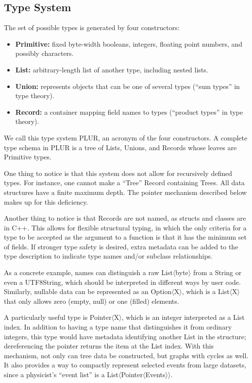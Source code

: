 \documentclass[10pt, conference, compsocconf]{IEEEtran}
\begin{document}
\subsection{Type System}
\label{type-system}

The set of possible types is generated by four constructors:
\begin{itemize}
\item {\bf Primitive:} fixed byte-width booleans, integers, floating point numbers, and possibly characters.
\item {\bf List:} arbitrary-length list of another type, including nested lists.
\item {\bf Union:} represents objects that can be one of several types (``sum types'' in type theory).
\item {\bf Record:} a container mapping field names to types (``product types'' in type theory).
\end{itemize}
We call this type system PLUR, an acronym of the four constructors. A complete type schema in PLUR is a tree of Lists, Unions, and Records whose leaves are Primitive types.

One thing to notice is that this system does not allow for recursively defined types. For instance, one cannot make a ``Tree'' Record containing Trees. All data structures have a finite maximum depth. The pointer mechanism described below makes up for this deficiency.

Another thing to notice is that Records are not named, as structs and classes are in C++. This allows for flexible structural typing, in which the only criteria for a type to be accepted as the argument to a function is that it has the minimum set of fields. If stronger type safety is desired, extra metadata can be added to the type description to indicate type names and/or subclass relationships.

As a concrete example, names can distinguish a raw List$\langle$byte$\rangle$ from a String or even a UTF8String, which should be interpreted in different ways by user code. Similarly, nullable data can be represented as an Option$\langle$X$\rangle$, which is a List$\langle$X$\rangle$ that only allows zero (empty, null) or one (filled) elements.

A particularly useful type is Pointer$\langle$X$\rangle$, which is an integer interpreted as a List index. In addition to having a type name that distinguishes it from ordinary integers, this type would have metadata identifying another List in the structure; dereferencing the pointer returns the item at the List index. With this mechanism, not only can tree data be constructed, but graphs with cycles as well. It also provides a way to compactly represent selected events from large datasets, since a physicist's ``event list'' is a List$\langle$Pointer$\langle$Events$\rangle\rangle$.
\end{document}
